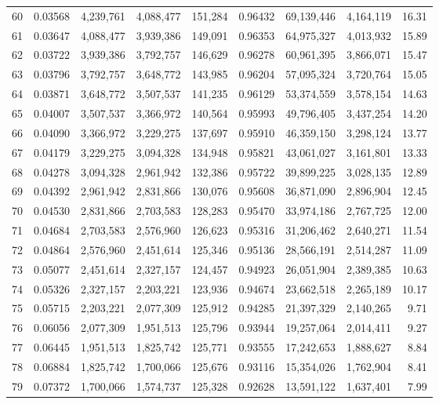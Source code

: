 \begin{longtable}{rrrrrrrrr}
60 & 0.03568 & 4,239,761 & 4,088,477 & 151,284 & 0.96432 & 69,139,446 & 4,164,119 & 16.31 \\
61 & 0.03647 & 4,088,477 & 3,939,386 & 149,091 & 0.96353 & 64,975,327 & 4,013,932 & 15.89 \\
62 & 0.03722 & 3,939,386 & 3,792,757 & 146,629 & 0.96278 & 60,961,395 & 3,866,071 & 15.47 \\
63 & 0.03796 & 3,792,757 & 3,648,772 & 143,985 & 0.96204 & 57,095,324 & 3,720,764 & 15.05 \\
64 & 0.03871 & 3,648,772 & 3,507,537 & 141,235 & 0.96129 & 53,374,559 & 3,578,154 & 14.63 \\
65 & 0.04007 & 3,507,537 & 3,366,972 & 140,564 & 0.95993 & 49,796,405 & 3,437,254 & 14.20 \\
66 & 0.04090 & 3,366,972 & 3,229,275 & 137,697 & 0.95910 & 46,359,150 & 3,298,124 & 13.77 \\
67 & 0.04179 & 3,229,275 & 3,094,328 & 134,948 & 0.95821 & 43,061,027 & 3,161,801 & 13.33 \\
68 & 0.04278 & 3,094,328 & 2,961,942 & 132,386 & 0.95722 & 39,899,225 & 3,028,135 & 12.89 \\
69 & 0.04392 & 2,961,942 & 2,831,866 & 130,076 & 0.95608 & 36,871,090 & 2,896,904 & 12.45 \\
70 & 0.04530 & 2,831,866 & 2,703,583 & 128,283 & 0.95470 & 33,974,186 & 2,767,725 & 12.00 \\
71 & 0.04684 & 2,703,583 & 2,576,960 & 126,623 & 0.95316 & 31,206,462 & 2,640,271 & 11.54 \\
72 & 0.04864 & 2,576,960 & 2,451,614 & 125,346 & 0.95136 & 28,566,191 & 2,514,287 & 11.09 \\
73 & 0.05077 & 2,451,614 & 2,327,157 & 124,457 & 0.94923 & 26,051,904 & 2,389,385 & 10.63 \\
74 & 0.05326 & 2,327,157 & 2,203,221 & 123,936 & 0.94674 & 23,662,518 & 2,265,189 & 10.17 \\
75 & 0.05715 & 2,203,221 & 2,077,309 & 125,912 & 0.94285 & 21,397,329 & 2,140,265 & 9.71 \\
76 & 0.06056 & 2,077,309 & 1,951,513 & 125,796 & 0.93944 & 19,257,064 & 2,014,411 & 9.27 \\
77 & 0.06445 & 1,951,513 & 1,825,742 & 125,771 & 0.93555 & 17,242,653 & 1,888,627 & 8.84 \\
78 & 0.06884 & 1,825,742 & 1,700,066 & 125,676 & 0.93116 & 15,354,026 & 1,762,904 & 8.41 \\
79 & 0.07372 & 1,700,066 & 1,574,737 & 125,328 & 0.92628 & 13,591,122 & 1,637,401 & 7.99 \\

\end{longtable}
